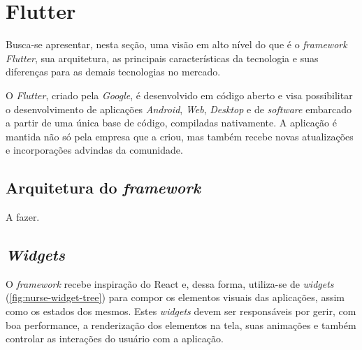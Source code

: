 \section[\textit{Flutter}]{Flutter}
Busca-se apresentar, nesta seção, uma visão em alto nível do que é o \textit{framework Flutter}, sua arquitetura, as principais características da tecnologia e suas diferenças para as demais tecnologias no mercado.

O \textit{Flutter}, criado pela \textit{Google}, é desenvolvido em código aberto e visa possibilitar o desenvolvimento de aplicações \textit{Android}, \textit{Web}, \textit{Desktop} e de \textit{software} embarcado a partir de uma única base de código, compiladas nativamente. A aplicação é mantida não só pela empresa que a criou, mas também recebe novas atualizações e incorporações advindas da comunidade.


\subsection{Arquitetura do \textit{framework}}
A fazer.

\subsection{\textit{Widgets}}
O \textit{framework} recebe inspiração do React e, dessa forma, utiliza-se de \textit{widgets} (\ref{fig:nurse-widget-tree}) para compor os elementos visuais das aplicações, assim como os estados dos mesmos. %
Estes \textit{widgets} devem ser responsáveis por gerir, com boa performance, a renderização dos elementos na tela, suas animações e também controlar as interações do usuário com a aplicação.

